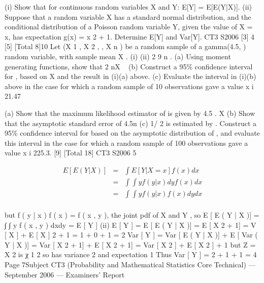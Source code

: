 \documentclass[a4paper,12pt]{article}
\begin{document}
\begin{enumerate}
[2]
[Total 8]
(i) Show that for continuous random variables X and Y:
E[Y] = E[E(Y|X)].
(ii)
Suppose that a random variable X has a standard normal distribution, and the
conditional distribution of a Poisson random variable Y, given the value of
X = x, has expectation g(x) = x 2 + 1.
Determine E[Y] and Var[Y].
CT3 S2006
[3]
4
[5]
[Total 8]10
Let (X 1 , X 2 ,
, X n ) be a random sample of a gamma(4.5, ) random variable, with sample mean X .
(i)
(ii)
2
9 n .
(a) Using moment generating functions, show that 2 nX ~
(b) Construct a 95\% confidence interval for , based on X and the result in (i)(a) above.
(c) Evaluate the interval in (i)(b) above in the case for which a random sample of 10 observations gave a value
x i 21.47

(a) Show that the maximum likelihood estimator of is given by
4.5
.
X
(b) Show that the asymptotic standard error of
4.5n
(c)
1/ 2
is estimated by
.
Construct a 95\% confidence interval for based on the asymptotic distribution of , and evaluate this interval in the case for which a
random sample of 100 observations gave a value x i 225.3.
[9]
[Total 18]
CT3 S2006
5

\begin{eqnarray*}
E [ E ( Y | X )] &=& ∫ E [ Y | X = x ] f ( x ) dx\\
&=& ∫ ∫ yf ( y | x ) dy f ( x ) dx\\
&=& ∫ ∫ y f ( y | x ) f ( x ) dydx\\
\end{eqnarray*}

but f ( y | x ) f ( x ) = f ( x , y ), the joint pdf of X and Y , so
E [ E ( Y | X )] = ∫ ∫ y f ( x , y ) dxdy = E [ Y ]
(ii)
E [ Y ] = E [ E ( Y | X )] = E [ X 2 + 1]
= V [ X ] + { E [ X ]} 2 + 1 = 1 + 0 + 1 = 2
Var [ Y ] = Var [ E ( Y | X )] + E [ Var ( Y | X )] = Var [ X 2 + 1] + E [ X 2 + 1]
= Var [ X 2 ] + E [ X 2 ] + 1
but Z = X 2 is χ 1 2 so has variance 2 and expectation 1
Thus Var [ Y ] = 2 + 1 + 1 = 4
Page 7Subject CT3 (Probability and Mathematical Statistics Core Technical) — September 2006 — Examiners’ Report



\end{enumerate}
\end{document}

